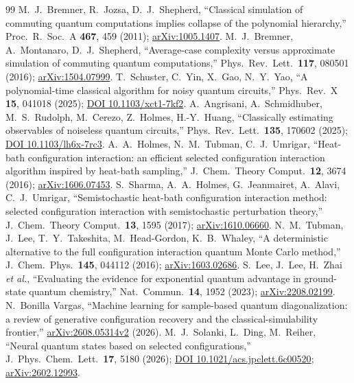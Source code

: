 \begin{thebibliography}{99}
 M.~J.~Bremner, R.~Jozsa, D.~J.~Shepherd, ``Classical simulation of commuting quantum computations implies collapse of the polynomial hierarchy,'' Proc.\ R.\ Soc.\ A \textbf{467}, 459 (2011); \href{https://arxiv.org/abs/1005.1407}{arXiv:1005.1407}.
 M.~J.~Bremner, A.~Montanaro, D.~J.~Shepherd, ``Average-case complexity versus approximate simulation of commuting quantum computations,'' Phys.\ Rev.\ Lett.\ \textbf{117}, 080501 (2016); \href{https://arxiv.org/abs/1504.07999}{arXiv:1504.07999}.
 T.~Schuster, C.~Yin, X.~Gao, N.~Y.~Yao, ``A polynomial-time classical algorithm for noisy quantum circuits,'' Phys.\ Rev.\ X \textbf{15}, 041018 (2025); \href{https://doi.org/10.1103/xct1-7kf2}{DOI 10.1103/xct1-7kf2}.
 A.~Angrisani, A.~Schmidhuber, M.~S.~Rudolph, M.~Cerezo, Z.~Holmes, H.-Y.~Huang, ``Classically estimating observables of noiseless quantum circuits,'' Phys.\ Rev.\ Lett.\ \textbf{135}, 170602 (2025); \href{https://doi.org/10.1103/lh6x-7rc3}{DOI 10.1103/lh6x-7rc3}.
 A.~A.~Holmes, N.~M.~Tubman, C.~J.~Umrigar, ``Heat-bath configuration interaction: an efficient selected configuration interaction algorithm inspired by heat-bath sampling,'' J.\ Chem.\ Theory Comput.\ \textbf{12}, 3674 (2016); \href{https://arxiv.org/abs/1606.07453}{arXiv:1606.07453}.
 S.~Sharma, A.~A.~Holmes, G.~Jeanmairet, A.~Alavi, C.~J.~Umrigar, ``Semistochastic heat-bath configuration interaction method: selected configuration interaction with semistochastic perturbation theory,'' J.\ Chem.\ Theory Comput.\ \textbf{13}, 1595 (2017); \href{https://arxiv.org/abs/1610.06660}{arXiv:1610.06660}.
 N.~M.~Tubman, J.~Lee, T.~Y.~Takeshita, M.~Head-Gordon, K.~B.~Whaley, ``A deterministic alternative to the full configuration interaction quantum Monte Carlo method,'' J.\ Chem.\ Phys.\ \textbf{145}, 044112 (2016); \href{https://arxiv.org/abs/1603.02686}{arXiv:1603.02686}.
 S.~Lee, J.~Lee, H.~Zhai \emph{et al.}, ``Evaluating the evidence for exponential quantum advantage in ground-state quantum chemistry,'' Nat.\ Commun.\ \textbf{14}, 1952 (2023); \href{https://arxiv.org/abs/2208.02199}{arXiv:2208.02199}.
 N.~Bonilla Vargas, ``Machine learning for sample-based quantum diagonalization: a review of generative configuration recovery and the classical-simulability frontier,'' \href{https://arxiv.org/abs/2608.05314v2}{arXiv:2608.05314v2} (2026).
 M.~J.~Solanki, L.~Ding, M.~Reiher, ``Neural quantum states based on selected configurations,'' J.\ Phys.\ Chem.\ Lett.\ \textbf{17}, 5180 (2026); \href{https://doi.org/10.1021/acs.jpclett.6c00520}{DOI 10.1021/acs.jpclett.6c00520}; \href{https://arxiv.org/abs/2602.12993}{arXiv:2602.12993}.

\end{thebibliography}
